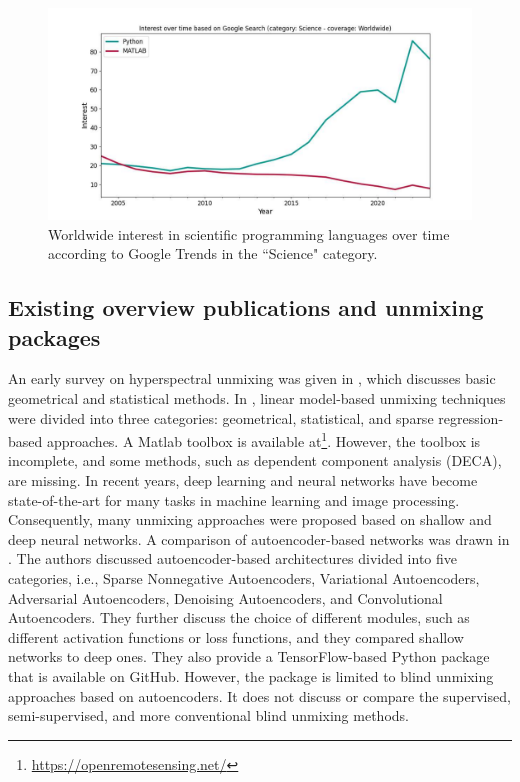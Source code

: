 \begin{figure}[h]
    \centering
    \includegraphics[width=\linewidth]{fichiers_latex/Chap4/figs/PythonVSMATLAB-bigger.pdf}
    \caption{Worldwide interest in scientific programming languages over time according to Google Trends in the ``Science" category.}
    \label{fig:matlab}
\end{figure}

\subsection{Existing overview publications and unmixing packages}

An early survey on hyperspectral unmixing was given in \cite{keshava_spectral_2002}, which discusses basic geometrical and statistical methods. In \cite{bioucas-dias_hyperspectral_2012}, linear model-based unmixing techniques were divided into three categories: geometrical, statistical, and sparse regression-based approaches. A Matlab toolbox is available at\footnote{\href{https://openremotesensing.net/}{https://openremotesensing.net/}}.  However, the toolbox is incomplete, and some methods, such as dependent component analysis (DECA), are missing. In recent years, deep learning and neural networks have become state-of-the-art for many tasks in machine learning and image processing. Consequently, many unmixing approaches were proposed based on shallow and deep neural networks. A comparison of autoencoder-based networks was drawn in \cite{palsson_blind_2022}. The authors discussed autoencoder-based architectures divided into five categories, i.e.,  Sparse Nonnegative Autoencoders,  Variational Autoencoders, Adversarial Autoencoders, Denoising Autoencoders, and Convolutional Autoencoders. They further discuss the choice of different modules, such as different activation functions or loss functions, and they compared shallow networks to deep ones. They also provide a TensorFlow-based Python package that is available on GitHub. However, the package is limited to blind unmixing approaches based on autoencoders. It does not discuss or compare the supervised, semi-supervised, and more conventional blind unmixing methods. 

